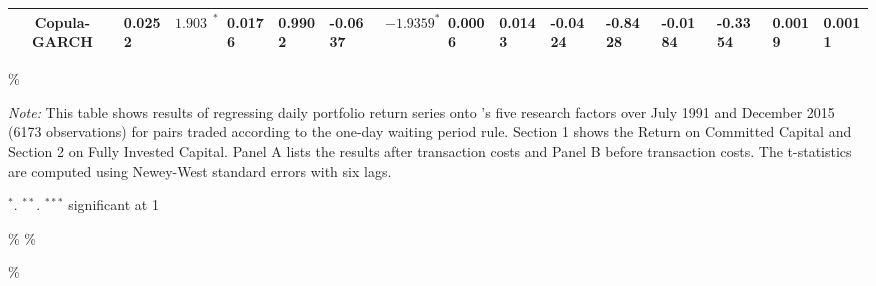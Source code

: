 \documentclass[a4paper]{article}
\begin{document}
\begin{sidewaystable}
\begin{threeparttable}[H]
\begin{tabularx}{\textwidth}{@{\extracolsep{\fill}}lllllllllllllll@{}}
			\multicolumn{1}{c}{Copula-GARCH} & 0.0252 & $1.9030^{*}$ & 0.0176 & 0.9902 & -0.0637 & $-1.9359^{*}$ & 0.0006 & 0.0143 & -0.0424 & -0.8428 & -0.0184 & -0.3354 & 0.0019 & 0.0011  \\
			\bottomrule
		\end{tabularx}\%
		\begin{tablenotes}
			\item \textit{Note:} \scriptsize  This table shows results of regressing daily portfolio return series onto \citet*{ff15}'s five research factors over July 1991 and December 2015 (6173 observations) for pairs traded according to the one-day waiting period rule. Section 1 shows the Return on Committed Capital and Section 2 on Fully Invested Capital. Panel A lists the results after transaction costs and Panel B before transaction costs. The t-statistics are computed using Newey-West standard errors with six lags.
			\item \scriptsize $^{\ast}$. $^{\ast\ast}$. $^{\ast\ast\ast}$  significant at 1\\%
		\end{tablenotes}
	\end{threeparttable}\%
	\label{tab:table115}\%
\end{sidewaystable}\%
\end{document}
